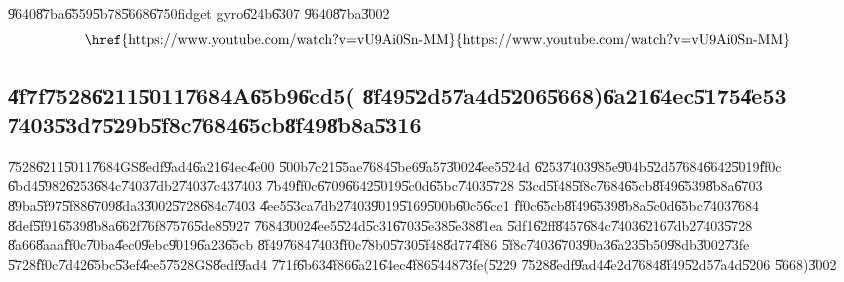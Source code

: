 \bigskip

\U{9640}\U{87ba}\U{6559}\U{5b78}\U{5668}\U{6750}fidget gyro\U{624b}\U{6307}%
\U{9640}\U{87ba}\U{3002}%
\begin{equation*}
\text{\href{https://www.youtube.com/watch?v=vU9Ai0Sn-MM}{%
https://www.youtube.com/watch?v=vU9Ai0Sn-MM}}
\end{equation*}%
\clearpage%

\subsection{\U{4f7f}\U{7528}\U{6211}\U{5011}\U{7684}A\U{65b9}\U{6cd5}(%
\U{8f49}\U{52d5}\U{7a4d}\U{5206}\U{5668})\U{6a21}\U{64ec}\U{5175}\U{4e53}%
\U{7403}\U{53d7}\U{529b}\U{5f8c}\U{7684}\U{65cb}\U{8f49}\U{8b8a}\U{5316}}

\U{7528}\U{6211}\U{5011}\U{7684}GS\U{8edf}\U{9ad4}\U{6a21}\U{64ec}\U{4e00}%
\U{500b}\U{7c21}\U{55ae}\U{7684}\U{5be6}\U{9a57}\U{3002}\U{4ee5}\U{524d}%
\U{6253}\U{7403}\U{985e}\U{904b}\U{52d5}\U{7684}\U{6642}\U{5019}\U{ff0c}%
\U{6bd4}\U{5982}\U{6253}\U{684c}\U{7403}\U{7db2}\U{7403}\U{7c43}\U{7403}%
\U{7b49}\U{ff0c}\U{6709}\U{6642}\U{5019}\U{5c0d}\U{65bc}\U{7403}\U{5728}%
\U{53cd}\U{5f48}\U{5f8c}\U{7684}\U{65cb}\U{8f49}\U{6539}\U{8b8a}\U{6703}%
\U{89ba}\U{5f97}\U{5f88}\U{6709}\U{8da3}\U{3002}\U{5728}\U{684c}\U{7403}%
\U{4ee5}\U{53ca}\U{7db2}\U{7403}\U{9019}\U{5169}\U{500b}\U{60c5}\U{6cc1}%
\U{ff0c}\U{65cb}\U{8f49}\U{6539}\U{8b8a}\U{5c0d}\U{65bc}\U{7403}\U{7684}%
\U{8def}\U{5f91}\U{6539}\U{8b8a}\U{662f}\U{76f8}\U{7576}\U{5de8}\U{5927}%
\U{7684}\U{3002}\U{4ee5}\U{524d}\U{5c31}\U{6703}\U{5e38}\U{5e38}\U{81ea}%
\U{5df1}\U{62ff}\U{8457}\U{684c}\U{7403}\U{6216}\U{7db2}\U{7403}\U{5728}%
\U{8a66}\U{8aaa}\U{ff0c}\U{70ba}\U{4ec0}\U{9ebc}\U{9019}\U{6a23}\U{65cb}%
\U{8f49}\U{7684}\U{7403}\U{ff0c}\U{78b0}\U{5730}\U{5f48}\U{8d77}\U{4f86}%
\U{5f8c}\U{7403}\U{6703}\U{90a3}\U{6a23}\U{5b50}\U{98db}\U{3002}\U{73fe}%
\U{5728}\U{ff0c}\U{7d42}\U{65bc}\U{53ef}\U{4ee5}\U{7528}GS\U{8edf}\U{9ad4}%
\U{771f}\U{6b63}\U{4f86}\U{6a21}\U{64ec}\U{4f86}\U{5448}\U{73fe}(\U{5229}%
\U{7528}\U{8edf}\U{9ad4}\U{4e2d}\U{7684}\U{8f49}\U{52d5}\U{7a4d}\U{5206}%
\U{5668})\U{3002}

\bigskip

